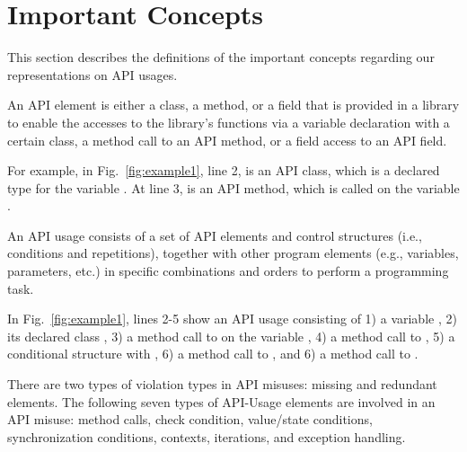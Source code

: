 \section{Important Concepts}
\label{sec:concepts}

This section describes the definitions of the important concepts
regarding our representations on API usages.


\begin{Definition}
An API element is either a class, a method, or a field that is
provided in a library to enable the accesses to the library's
functions via a variable declaration with a certain class, a method
call to an API method, or a field access to an API field.
\end{Definition}

For example, in Fig.~\ref{fig:example1}, line 2,  is
an API class, which is a declared type for the variable
. At line 3,  is an API
method, which is called on the variable .

\begin{Definition}
An API usage consists of a set of API elements and control structures
(i.e., conditions and repetitions), together with other program
elements (e.g., variables, parameters, etc.) in specific combinations
and orders to perform a programming task.
\end{Definition}

In Fig.~\ref{fig:example1}, lines 2-5 show an API usage consisting of
1) a variable , 2) its declared class
, 3) a method call to  on the
variable , 4) a method call to , 5)
a conditional structure with , 6) a method call to
, and 6) a method call to
.

\begin{Definition}
There are two types of violation types in API misuses: missing and
redundant elements. The following seven types of API-Usage elements are
involved in an API misuse: method calls,  check condition,
value/state conditions, synchronization conditions, contexts,
iterations, and exception handling.
\end{Definition}


